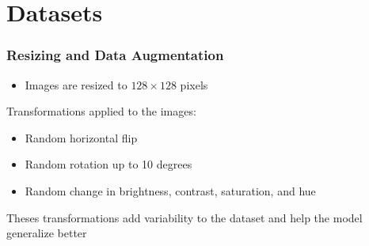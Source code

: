 \documentclass[../presentation.tex]{subfiles} %
\begin{document}
\section{Datasets}

\begin{frame}

    \frametitle{Resizing and Data Augmentation}

    \begin{cbox}[orange]
        \begin{itemize}
            \item Images are resized to $128 \times 128$ pixels
        \end{itemize}
    \end{cbox}

    \vspace{0.2cm}

    \begin{cbox}
        Transformations applied to the images:
        \begin{itemize}
            \item Random horizontal flip
            \item Random rotation up to 10 degrees
            \item Random change in brightness, contrast, saturation, and hue
        \end{itemize}

        \vspace{0.2cm}

        Theses transformations add variability to the dataset and help the model generalize better
    \end{cbox}

\end{frame}
\end{document}
